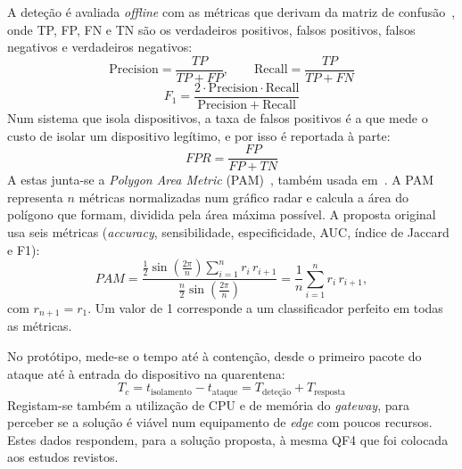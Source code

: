 \documentclass[conference,a4paper]{IEEEtran}
\begin{document}
A deteção é avaliada \textit{offline} com as métricas que derivam da matriz de
confusão~\cite{sokolova2009systematic}, onde TP, FP, FN e TN são os verdadeiros positivos,
falsos positivos, falsos negativos e verdadeiros negativos:
\begin{equation}
\mathrm{Precision}=\frac{TP}{TP+FP},\qquad \mathrm{Recall}=\frac{TP}{TP+FN}
\label{eq:precrec}
\end{equation}
\begin{equation}
F_1 = \frac{2\cdot \mathrm{Precision}\cdot \mathrm{Recall}}{\mathrm{Precision}+\mathrm{Recall}}
\label{eq:f1}
\end{equation}
Num sistema que isola dispositivos, a taxa de falsos positivos é a que mede o custo de
isolar um dispositivo legítimo, e por isso é reportada à parte:
\begin{equation}
FPR = \frac{FP}{FP+TN}
\label{eq:fpr}
\end{equation}
A estas junta-se a \textit{Polygon Area Metric} (PAM)~\cite{aydemir2020pam}, também usada
em~\cite{noetzold2026anomaly}. A PAM representa $n$ métricas normalizadas num gráfico
radar e calcula a área do polígono que formam, dividida pela área máxima possível. A
proposta original usa seis métricas (\textit{accuracy}, sensibilidade, especificidade,
AUC, índice de Jaccard e F1):
\begin{equation}
PAM = \frac{\frac{1}{2}\sin\left(\frac{2\pi}{n}\right)\sum_{i=1}^{n} r_i\, r_{i+1}}
{\frac{n}{2}\sin\left(\frac{2\pi}{n}\right)}
= \frac{1}{n}\sum_{i=1}^{n} r_i\, r_{i+1},
\label{eq:pam}
\end{equation}
com $r_{n+1} = r_1$. Um valor de 1 corresponde a um classificador perfeito em todas as
métricas.

No protótipo, mede-se o tempo até à contenção, desde o primeiro pacote do ataque até à
entrada do dispositivo na quarentena:
\begin{equation}
T_c = t_{\text{isolamento}} - t_{\text{ataque}} = T_{\text{deteção}} + T_{\text{resposta}}
\label{eq:tc}
\end{equation}
Registam-se também a utilização de CPU e de memória do \textit{gateway}, para perceber se
a solução é viável num equipamento de \textit{edge} com poucos recursos. Estes dados
respondem, para a solução proposta, à mesma QF4 que foi colocada aos estudos revistos.

\end{document}
